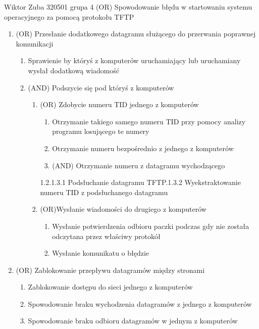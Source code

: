 \documentclass{article}
\begin{document}
Wiktor Zuba 320501 grupa 4
\newline\newline
(OR) Spowodowanie błędu w startowaniu systemu operacyjnego za pomocą protokołu TFTP
\begin{enumerate}[label*=\arabic*.]
  \item (OR) Przesłanie dodatkowego datagramu służącego do przerwania poprawnej komunikacji
  \begin{enumerate}[label*=\arabic*.]
    \item Sprawienie by któryś z komputerów uruchamiający lub uruchamiany wysłał dodatkową wiadomość
    \item (AND) Podszycie się pod któryś z komputerów
    \begin{enumerate}[label*=\arabic*.]
      \item (OR) Zdobycie numeru TID jednego z komputerów
      \begin{enumerate}[label*=\arabic*.]
	\item Otrzymanie takiego samego numeru TID przy pomocy analizy programu losującego te numery
	\item Otrzymanie numeru bezpośrednio z jednego z komputerów
	\item (AND) Otrzymanie numeru z datagramu wychodzącego
	\end{enumerate}
	  1.2.1.3.1 Podsłuchanie datagramu TFTP.1.3.2 Wyekstraktowanie numeru TID z podsłuchanego datagramu
      \item (OR)Wysłanie wiadomości do drugiego z komputerów
      \begin{enumerate}[label*=\arabic*.]
	\item Wysłanie potwierdzenia odbioru paczki podczas gdy nie została odczytana przez właściwy protokół
	\item Wysłanie komunikatu o błędzie
      \end{enumerate}
    \end{enumerate}
  \end{enumerate}
  \item (OR) Zablokowanie przepływu datagramów między stronami
    \begin{enumerate}[label*=\arabic*.]
      \item Zablokowanie dostępu do sieci jednego z komputerów
      \item Spowodowanie braku wychodzenia datagramów z jednego z komputerów
      \item Spowodowanie braku odbioru datagramów w jednym z komputerów

\end{enumerate}
\end{enumerate}
\end{document}
